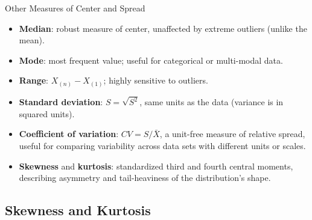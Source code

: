 \documentclass[11pt,aspectratio=169]{beamer}
\newcommand{\Xbar}{\bar{X}}
\begin{document}
\begin{frame}{Other Measures of Center and Spread}
\begin{itemize}
    \item \textbf{Median}: robust measure of center, unaffected by extreme
          outliers (unlike the mean).
    \item \textbf{Mode}: most frequent value; useful for categorical or
          multi-modal data.
    \item \textbf{Range}: $X_{(n)}-X_{(1)}$; highly sensitive to outliers.
    \item \textbf{Standard deviation}: $S=\sqrt{S^2}$, same units as the
          data (variance is in squared units).
    \item \textbf{Coefficient of variation}: $CV = S/\Xbar$, a unit-free
          measure of relative spread, useful for comparing variability
          across data sets with different units or scales.
    \item \textbf{Skewness} and \textbf{kurtosis}: standardized third and
          fourth central moments, describing asymmetry and tail-heaviness
          of the distribution's shape.
\end{itemize}
\end{frame}

\subsection{Skewness and Kurtosis}
\end{document}
